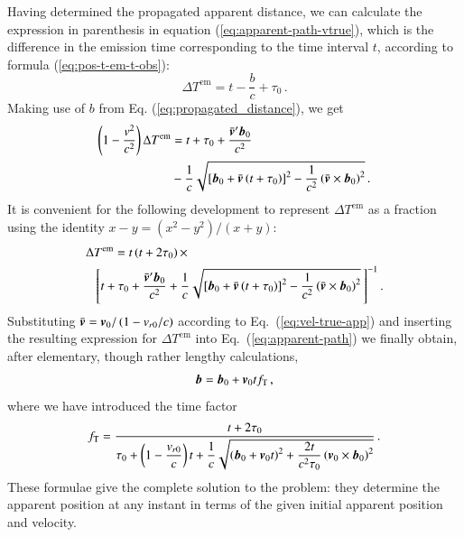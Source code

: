 \documentclass{aa}
\def\vec#1{\ensuremath{\mathchoice{\mbox{\boldmath$\displaystyle#1$}}
{\mbox{\boldmath$\textstyle#1$}}
{\mbox{\boldmath$\scriptstyle#1$}}
{\mbox{\boldmath$\scriptscriptstyle#1$}}}}
\begin{document}
Having determined the propagated apparent distance, we can calculate the expression in parenthesis in equation (\ref{eq:apparent-path-vtrue}), which is the difference in the emission time corresponding to the time interval $t$, according to formula (\ref{eq:pos-t-em-t-obs}):
\begin{equation}\label{eq:Tem}
    \Delta T^\mathrm{em}=t-\frac{b}{c}+\tau_0\,.
\end{equation}
Making use of $b$ from Eq. (\ref{eq:propagated_distance}), we get
\begin{equation}
\begin{aligned}
 \left(1-\frac{v^2}{c^2}\right)\Delta T^\mathrm{em}&=
 t+\tau_0+\frac{\bar{\vec{v}}'\vec{b}_0}{c^2}\\
 &-\frac{1}{c}\sqrt{\left[\vec{b}_0+\bar{\vec{v}}\left(t+\tau_0\right)\right]^2-
        \frac{1}{c^2}\left(\bar{\vec{v}}\times\vec{b}_0\right)^2} \, .
\end{aligned}
\end{equation}
It is convenient for the following development to represent
$\Delta T^\mathrm{em}$ as a fraction using the identity
$x-y=(x^2-y^2)/(x+y)$:
\begin{equation}\label{eq37}
 \begin{aligned}
 \Delta&T^\mathrm{em}=
 t\left(t+2\tau_0\right)\times\\
 &\left[t+\tau_0+\dfrac{\bar{\vec{v}}'\vec{b}_0}{c^2}+
  \dfrac{1}{c}
  \sqrt{\left[\vec{b}_0+\bar{\vec{v}} \left(t+\tau_0\right)\right]^2-
        \dfrac{1}{c^2}\left(\bar{\vec{v}}\times\vec{b}_0\right)^2}\,\right]^{-1}.
 \end{aligned}
\end{equation}
Substituting $\bar{\vec{v}}=\vec{v}_0/\left(1-v_{r0}/c\right)$ according to Eq.~(\ref{eq:vel-true-app}) and inserting the resulting expression for $\Delta T^\mathrm{em}$ into Eq.~(\ref{eq:apparent-path}) we finally obtain, after elementary, though rather lengthy calculations,
\begin{equation}\label{eq:apparent-path-solution}
 \vec{b}=\vec{b}_0+\vec{v}_0tf_\mathrm{T}\,,
\end{equation}
where we have introduced the time factor
\begin{equation}
 f_\mathrm{T}=
 \frac{t+2\tau_0}
 {\tau_0+\left(1-\dfrac{v_{r0}}{c}\right)t+
  \dfrac{1}{c}\sqrt{\left(\vec{b}_0+\vec{v}_0t\right)^2+
  \dfrac{2t}{c^2\tau_0}\left(\vec{v}_0\times\vec{b}_0\right)^2}} \, .
\end{equation}
These formulae give the complete solution to the problem: they determine the apparent position at any instant in terms of the given initial apparent position and velocity.
\end{document}
